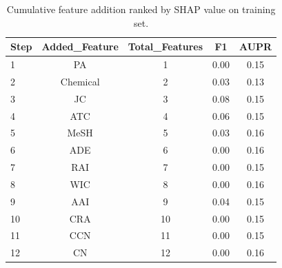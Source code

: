 \begin{table}[htbp]
\centering
\caption{Cumulative feature addition ranked by SHAP value on training set.}
\label{tab:shap_cumulative}
\begin{tabular}{lcccc}
\toprule
Step & Added_Feature & Total_Features & F1 & AUPR \\
\midrule
1 & PA & 1 & 0.00 & 0.15 \\
2 & Chemical & 2 & 0.03 & 0.13 \\
3 & JC & 3 & 0.08 & 0.15 \\
4 & ATC & 4 & 0.06 & 0.15 \\
5 & MeSH & 5 & 0.03 & 0.16 \\
6 & ADE & 6 & 0.00 & 0.16 \\
7 & RAI & 7 & 0.00 & 0.15 \\
8 & WIC & 8 & 0.00 & 0.16 \\
9 & AAI & 9 & 0.04 & 0.15 \\
10 & CRA & 10 & 0.00 & 0.15 \\
11 & CCN & 11 & 0.00 & 0.15 \\
12 & CN & 12 & 0.00 & 0.16 \\
\bottomrule
\end{tabular}
\end{table}